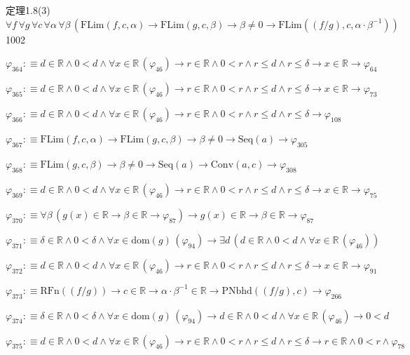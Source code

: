\begin{fullproof}{定理1.8(3)}{$\forall f\,\forall g\,\forall c\,\forall \alpha\,\forall \beta\,(\mathrm{FLim}(f,c,\alpha) \to \mathrm{FLim}(g,c,\beta) \to \beta \neq 0 \to \mathrm{FLim}((f / g),c,\alpha \cdot \beta^{-1}))$}{1002}
\begin{abbrevlist}
\item $\varphi_{364} :\equiv d \in \mathbb{R} \land 0 < d \land \forall x \in \mathbb{R}\,(\varphi_{46}) \to r \in \mathbb{R} \land 0 < r \land r \leq d \land r \leq \delta \to x \in \mathbb{R} \to \varphi_{64}$
\item $\varphi_{365} :\equiv d \in \mathbb{R} \land 0 < d \land \forall x \in \mathbb{R}\,(\varphi_{46}) \to r \in \mathbb{R} \land 0 < r \land r \leq d \land r \leq \delta \to x \in \mathbb{R} \to \varphi_{73}$
\item $\varphi_{366} :\equiv d \in \mathbb{R} \land 0 < d \land \forall x \in \mathbb{R}\,(\varphi_{46}) \to r \in \mathbb{R} \land 0 < r \land r \leq d \land r \leq \delta \to \varphi_{108}$
\item $\varphi_{367} :\equiv \mathrm{FLim}(f,c,\alpha) \to \mathrm{FLim}(g,c,\beta) \to \beta \neq 0 \to \mathrm{Seq}(a) \to \varphi_{305}$
\item $\varphi_{368} :\equiv \mathrm{FLim}(g,c,\beta) \to \beta \neq 0 \to \mathrm{Seq}(a) \to \mathrm{Conv}(a,c) \to \varphi_{308}$
\item $\varphi_{369} :\equiv d \in \mathbb{R} \land 0 < d \land \forall x \in \mathbb{R}\,(\varphi_{46}) \to r \in \mathbb{R} \land 0 < r \land r \leq d \land r \leq \delta \to x \in \mathbb{R} \to \varphi_{75}$
\item $\varphi_{370} :\equiv \forall \beta\,(g(x) \in \mathbb{R} \to \beta \in \mathbb{R} \to \varphi_{87}) \to g(x) \in \mathbb{R} \to \beta \in \mathbb{R} \to \varphi_{87}$
\item $\varphi_{371} :\equiv \delta \in \mathbb{R} \land 0 < \delta \land \forall x \in \mathrm{dom}(g)\,(\varphi_{94}) \to \exists d\,(d \in \mathbb{R} \land 0 < d \land \forall x \in \mathbb{R}\,(\varphi_{46}))$
\item $\varphi_{372} :\equiv d \in \mathbb{R} \land 0 < d \land \forall x \in \mathbb{R}\,(\varphi_{46}) \to r \in \mathbb{R} \land 0 < r \land r \leq d \land r \leq \delta \to x \in \mathbb{R} \to \varphi_{91}$
\item $\varphi_{373} :\equiv \mathrm{RFn}((f / g)) \to c \in \mathbb{R} \to \alpha \cdot \beta^{-1} \in \mathbb{R} \to \mathrm{PNbhd}((f / g),c) \to \varphi_{266}$
\item $\varphi_{374} :\equiv \delta \in \mathbb{R} \land 0 < \delta \land \forall x \in \mathrm{dom}(g)\,(\varphi_{94}) \to d \in \mathbb{R} \land 0 < d \land \forall x \in \mathbb{R}\,(\varphi_{46}) \to 0 < d$
\item $\varphi_{375} :\equiv d \in \mathbb{R} \land 0 < d \land \forall x \in \mathbb{R}\,(\varphi_{46}) \to r \in \mathbb{R} \land 0 < r \land r \leq d \land r \leq \delta \to r \in \mathbb{R} \land 0 < r \land \varphi_{78}$

\end{abbrevlist}
\end{fullproof}
